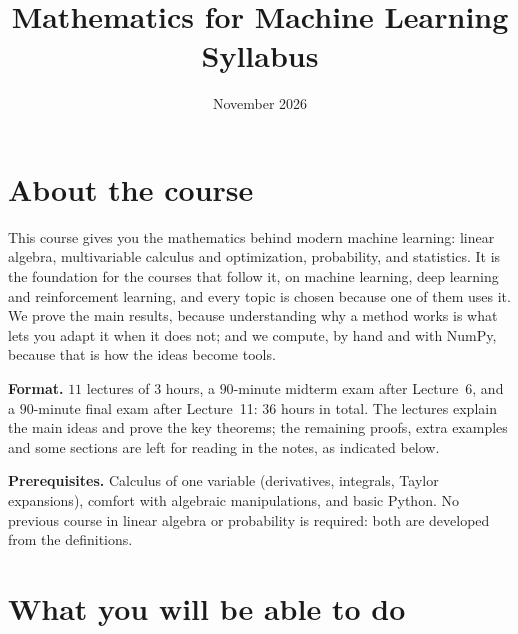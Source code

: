 \documentclass[11pt]{article}
\title{Mathematics for Machine Learning\\[0.3em]\large Syllabus}
\author{}
\date{November 2026}
\begin{document}
\maketitle

\section*{About the course}

This course gives you the mathematics behind modern machine learning: linear algebra, multivariable calculus and optimization, probability, and statistics. It is the foundation for the courses that follow it, on machine learning, deep learning and reinforcement learning, and every topic is chosen because one of them uses it. We prove the main results, because understanding why a method works is what lets you adapt it when it does not; and we compute, by hand and with NumPy, because that is how the ideas become tools.

\textbf{Format.} $11$ lectures of $3$ hours, a $90$-minute midterm exam after Lecture~6, and a $90$-minute final exam after Lecture~11: $36$ hours in total. The lectures explain the main ideas and prove the key theorems; the remaining proofs, extra examples and some sections are left for reading in the notes, as indicated below.

\textbf{Prerequisites.} Calculus of one variable (derivatives, integrals, Taylor expansions), comfort with algebraic manipulations, and basic Python. No previous course in linear algebra or probability is required: both are developed from the definitions.

\section*{What you will be able to do}
\end{document}
